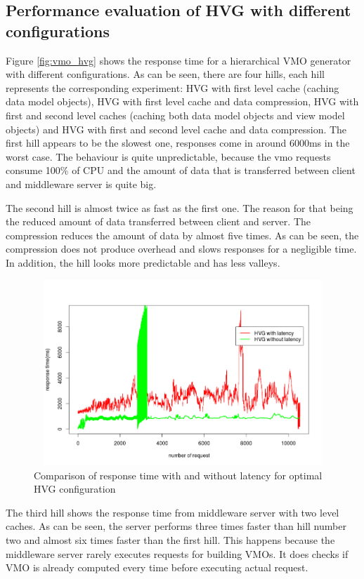 \subsection{Performance evaluation of HVG with different configurations}

Figure \ref{fig:vmo_hvg} shows the response time for a hierarchical VMO generator with different configurations. As can be seen, there are four hills, each hill represents the corresponding experiment: HVG with first level cache (caching data model objects), HVG with first level cache and data compression, HVG with first and second level caches (caching both data model objects and view model objects) and HVG with first and second level cache and data compression. The first hill appears to be the slowest one, responses come in around 6000ms in the worst case. The behaviour is quite unpredictable, because the vmo requests consume 100\% of CPU and the amount of data that is transferred between client and middleware server is quite big.


The second hill is almost twice as fast as the first one. The reason for that being the  reduced amount of data transferred between client and server. The compression reduces the amount of data by almost five times. As can be seen, the compression does not produce overhead and slows responses for a negligible time. In addition, the hill looks more predictable and has less valleys.  


\begin{figure}[h!]
    \centering
    \includegraphics[width=15cm,height=7cm,keepaspectratio]{images/hvg_latency_comparison.png}
    \caption{Comparison of response time with and without latency for optimal HVG configuration}
    \label{fig:hvg_comparison}
\end{figure}


The third hill shows the response time from middleware server with two level caches. As can be seen, the server performs three times faster than hill number two and almost six times faster than the first hill. This happens because the middleware server rarely executes requests for building VMOs. It does checks if VMO is already computed every time before executing actual request. 

